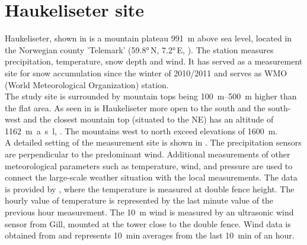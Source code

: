 \section{Haukeliseter site}\label{sec:dim:site}

Haukeliseter, shown in  is a mountain plateau \SI{991}{\m} above sea level, located in the Norwegian county 'Telemark' (\ang{59.8}\,N, \ang{7.2}\,E, ). The station measures precipitation, temperature, snow depth and wind. It has served as a measurement site for snow accumulation since the winter of 2010/2011 \citep{wolff_new_2010, wolff_measurements_2013, wolff_derivation_2015} and serves as WMO (World Meteorological Organization) station. \\
The study site is surrounded by mountain tops being \SIrange{100}{500}{\metre} higher than the flat area. As seen in  is Haukeliseter more open to the south and the south-west and the closest mountain top (situated to the NE) has an altitude of \SI{1162}{\metre a.s.l},  \citep{wolff_derivation_2015}. The mountains west to north exceed elevations of \SI{1600}{\metre}.
\\
A detailed setting of the measurement site is shown in . The precipitation sensors are perpendicular to the predominant wind. Additional measurements of other meteorological parameters such as temperature, wind, and pressure are used to connect the large-scale weather situation with the local measurements. The data is provided by \citet{eklima_norwegian_2016}, where the temperature is measured at double fence height. The hourly value of temperature is represented by the last minute value of the previous hour measurement. The \SI{10}{\metre} wind is measured by an ultrasonic wind sensor from Gill, mounted at the tower close to the double fence. Wind data is obtained from \citet{eklima_norwegian_2016} and represents \SI{10}{\minute} averages from the last \SI{10}{\minute} of an hour.
